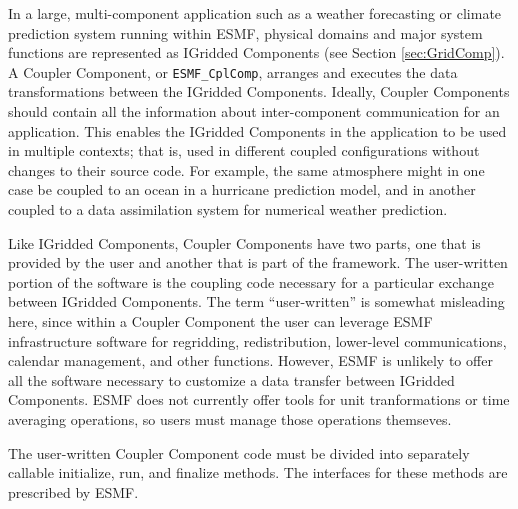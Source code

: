 %

\label{sec:CplComp}

In a large, multi-component application such as a weather 
forecasting or climate prediction system running within ESMF, 
physical domains and major system functions are represented 
as IGridded Components 
(see Section \ref{sec:GridComp}).  A Coupler Component, or 
{\tt ESMF\_CplComp}, arranges and executes the data 
transformations between the IGridded Components.  Ideally, 
Coupler Components should contain all the information 
about inter-component communication for an application.
This enables the IGridded Components in the application to be 
used in multiple contexts; that is, used in different coupled 
configurations without changes to their source code. 
For example, the same atmosphere might in one case be coupled 
to an ocean in a hurricane prediction model, and in another
coupled to a data assimilation system for numerical weather 
prediction.

Like IGridded Components, Coupler Components have two parts, one
that is provided by the user and another that is part of the 
framework.  The user-written portion of the software is the coupling
code necessary for a particular exchange between IGridded Components.  
The term ``user-written'' is somewhat misleading here, since within 
a Coupler Component the user can leverage ESMF infrastructure 
software for regridding, redistribution, lower-level communications, 
calendar management, and other functions.  However, ESMF is unlikely 
to offer all the software necessary to customize a data transfer
between IGridded Components.  ESMF does not currently offer tools 
for unit tranformations or time averaging operations, so users 
must manage those operations themseves.

The user-written Coupler Component code must be divided into 
separately callable initialize, run, and finalize methods.  The 
interfaces for these methods are prescribed by ESMF.

